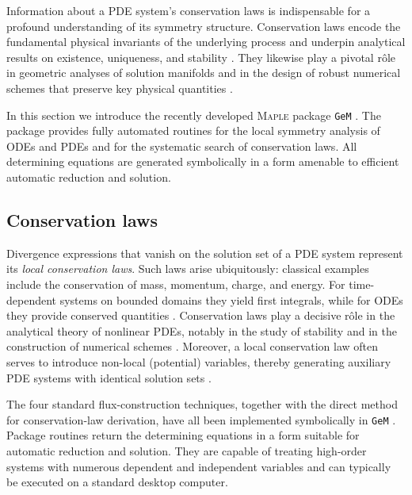 \documentclass[alpha-refs, 12pt]{wiley-article}
\begin{document}
Information about a PDE system's conservation laws is indispensable for a profound understanding of its symmetry structure. Conservation laws encode the fundamental physical invariants of the underlying process and underpin analytical results on existence, uniqueness, and stability \cite{Olver1993, Evans2010}. They likewise play a pivotal rôle in geometric analyses of solution manifolds \cite{Bluman1987} and in the design of robust numerical schemes that preserve key physical quantities \cite{LeVeque2002}.

In this section we introduce the recently developed \textsc{Maple} package \texttt{GeM} \cite{Cheviakov2007}. The package provides fully automated routines for the local symmetry analysis of ODEs and PDEs and for the systematic search of conservation laws. All determining equations are generated symbolically in a form amenable to efficient automatic reduction and solution.

\subsection{Conservation laws}\label{ssec:CL}

Divergence expressions that vanish on the solution set of a PDE system represent its \emph{local conservation laws}. Such laws arise ubiquitously: classical examples include the conservation of mass, momentum, charge, and energy. For time-dependent systems on bounded domains they yield first integrals, while for ODEs they provide conserved quantities \cite{Cheviakov2010}. Conservation laws play a decisive rôle in the analytical theory of nonlinear PDEs, notably in the study of stability and in the construction of numerical schemes \cite{Lax1968, Knops1984}. Moreover, a local conservation law often serves to introduce non-local (potential) variables, thereby generating auxiliary PDE systems with identical solution sets \cite{Bluman1987, Sjoberg2004}.

The four standard flux-construction techniques, together with the direct method for conservation-law derivation, have all been implemented symbolically in \texttt{GeM} \cite{Cheviakov2007}. Package routines return the determining equations in a form suitable for automatic reduction and solution. They are capable of treating high-order systems with numerous dependent and independent variables and can typically be executed on a standard desktop computer.
\end{document}
